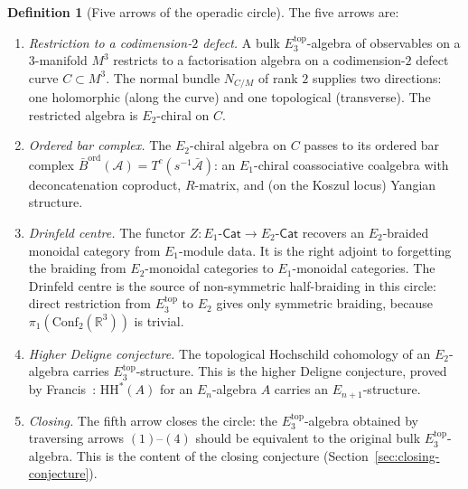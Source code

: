 \documentclass[11pt,reqno]{amsart}
\theoremstyle{definition}
\newtheorem{definition}[theorem]{Definition}
\theoremstyle{remark}
\providecommand{\cA}{\mathcal{A}}
\providecommand{\Conf}{\mathrm{Conf}}
\providecommand{\Eone}{E_1}
\providecommand{\Etwo}{E_2}
\providecommand{\Ethree}{E_3}
\providecommand{\En}{E_n}
\providecommand{\Barord}{\bar{B}^{\mathrm{ord}}}
\providecommand{\HH}{\mathrm{HH}}
\providecommand{\bR}{\mathbb{R}}
\begin{document}
\begin{definition}[Five arrows of the operadic circle]
\label{def:e-five-arrows}
The five arrows are:
\begin{enumerate}[label=\textup{(\arabic*)}]
\item \emph{Restriction to a codimension-$2$ defect.}
 A bulk $\Ethree^{\mathrm{top}}$-algebra of observables on
 a $3$-manifold $M^3$ restricts to a factorisation algebra
 on a codimension-$2$ defect curve $C \subset M^3$. The
 normal bundle $N_{C/M}$ of rank $2$ supplies two
 directions: one holomorphic (along the curve) and one
 topological (transverse). The restricted algebra is
 $\Etwo$-chiral on $C$.
\item \emph{Ordered bar complex.}
 The $\Etwo$-chiral algebra on $C$ passes to its ordered
 bar complex $\Barord(\cA) = T^c(s^{-1}\bar{\cA})$:
 an $\Eone$-chiral coassociative coalgebra with
 deconcatenation coproduct, $R$-matrix, and (on the
 Koszul locus) Yangian structure.
\item \emph{Drinfeld centre.}
 The functor
 $Z \colon \Eone\text{-}\mathsf{Cat} \to
 \Etwo\text{-}\mathsf{Cat}$ recovers an
 $\Etwo$-braided monoidal category from $\Eone$-module
 data. It is the right adjoint to forgetting the braiding from
 \(\Etwo\)-monoidal categories to \(\Eone\)-monoidal categories.
 The Drinfeld centre is the source of non-symmetric half-braiding in
 this circle: direct restriction from
 $\Ethree^{\mathrm{top}}$ to $\Etwo$ gives only
 symmetric braiding, because
 $\pi_1(\Conf_2(\bR^3))$ is trivial.
\item \emph{Higher Deligne conjecture.}
 The topological Hochschild cohomology of an $\Etwo$-algebra carries
 $\Ethree^{\mathrm{top}}$-structure. This is the higher
 Deligne conjecture, proved by
 Francis~\cite{Francis2013}: $\HH^*(A)$ for an
 $\En$-algebra $A$ carries an $E_{n+1}$-structure.
\item \emph{Closing.}
 The fifth arrow closes the circle: the
 $\Ethree^{\mathrm{top}}$-algebra obtained by traversing
 arrows $(1)$--$(4)$ should be equivalent to the original
 bulk $\Ethree^{\mathrm{top}}$-algebra. This is the
 content of the closing conjecture
 (Section~\ref{sec:closing-conjecture}).
\end{enumerate}
\end{definition}
\end{document}
